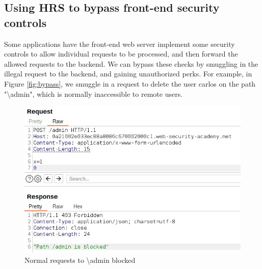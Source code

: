 \documentclass[conference]{IEEEtran}
\begin{document}
\subsection*{Using HRS to bypass front-end security controls}
Some applications have the front-end web server implement some security controls to allow individual requests to be processed, and then forward the allowed requests to the backend. We can bypass these checks by smuggling in the illegal request to the backend, and gaining unauthorized perks. For example, in Figure \ref*{fig:bypass}, we smuggle in a request to delete the user carlos on the path "\textbackslash admin", which is normally inaccessible to remote users. 

\begin{figure}[htbp]
	\centering
  
	\begin{minipage}{\linewidth}
	  \centering
	  \includegraphics[width=0.6\linewidth]{results/Bypass_frontend_req0_admin_blocked.jpeg}
	  \captionsetup{justification=centering}
	  \caption*{Normal requests to \textbackslash admin blocked}
	  \label{fig:bypass_req0}
	\end{minipage}
  
	\vspace{\baselineskip} %
  

\end{figure}
\end{document}
